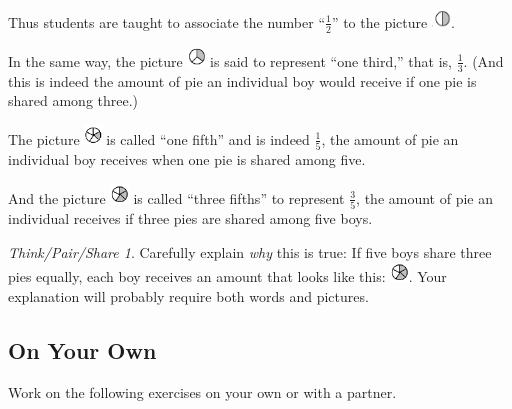 \documentclass[10pt, reqno]{amsart}
\theoremstyle{remark}
\newtheorem*{thinkpair*}{Think/Pair/Share}
\theoremstyle{definition}
\numberwithin{equation}{section}  %
\begin{document}
Thus students are taught to associate the number ``$\frac 1 2$'' to the picture
\includegraphics[height = 15pt]{halfpie}.

In the same way, the picture \includegraphics[height = 15pt]{thirdpie} is said to represent ``one third,'' that is,
$ \frac 1 3$.
(And this is indeed the amount of pie an individual boy would receive if one pie is
shared among three.)


The picture
\includegraphics[height = 15pt]{fifthpie}
 is called ``one fifth'' and is indeed
$\frac 1 5$, the amount of pie an
individual boy receives when one pie is shared among five.
 
And the picture
 \includegraphics[height = 15pt]{3fifthpie}
 is called ``three fifths'' to represent
$\frac 3 5$,
the amount of pie
an individual receives if three pies are shared among five boys.
 
 \begin{thinkpair*}
 Carefully explain \emph{why} this is true: If five boys share three pies equally, each boy receives an amount that looks like this:  \includegraphics[height = 15pt]{3fifthpie}.  Your explanation will probably require both words and pictures.

 \end{thinkpair*}
 
 
\subsection*{On Your Own}
 Work on the following exercises on your own or with a partner.
 
\end{document}
